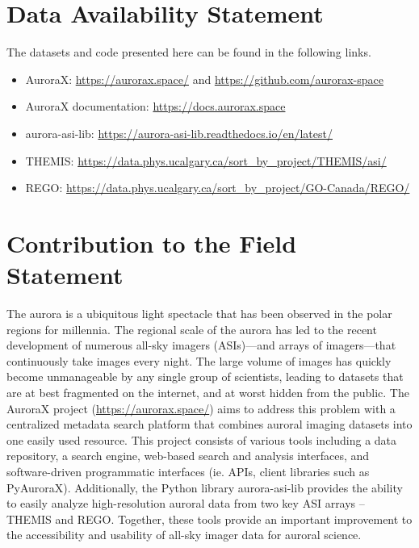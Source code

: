 \documentclass[utf8]{FrontiersinHarvard} %
\begin{document}
\section*{Data Availability Statement}
The datasets and code presented here can be found in the following links.
\begin{itemize}
    \item AuroraX: \url{https://aurorax.space/} and \url{https://github.com/aurorax-space}
    \item AuroraX documentation: \url{https://docs.aurorax.space}
    \item aurora-asi-lib: \url{https://aurora-asi-lib.readthedocs.io/en/latest/}
    \item THEMIS: \url{https://data.phys.ucalgary.ca/sort_by_project/THEMIS/asi/}
    \item REGO: \url{https://data.phys.ucalgary.ca/sort_by_project/GO-Canada/REGO/}
\end{itemize}

\section*{Contribution to the Field Statement}
\noindent The aurora is a ubiquitous light spectacle that has been observed in the polar regions for millennia. The regional scale of the aurora has led to the recent development of numerous all-sky imagers (ASIs)---and arrays of imagers---that continuously take images every night. The large volume of images has quickly become unmanageable by any single group of scientists, leading to datasets that are at best fragmented on the internet, and at worst hidden from the public. The AuroraX project (\url{https://aurorax.space/}) aims to address this problem with a centralized metadata search platform that combines auroral imaging datasets into one easily used resource. This project consists of various tools including a data repository, a search engine, web-based search and analysis interfaces, and software-driven programmatic interfaces (ie. APIs, client libraries such as PyAuroraX). Additionally, the Python library aurora-asi-lib provides the ability to easily analyze high-resolution auroral data from two key ASI arrays – THEMIS and REGO. Together, these tools provide an important improvement to the accessibility and usability of all-sky imager data for auroral science.

 

\end{document}
